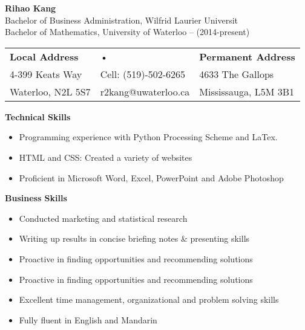 \documentclass[12pt,a4paper]{article}
\begin{document}
\begin{center}
\textbf{\Large{Rihao Kang}}\\
Bachelor of Business Administration, Wilfrid Laurier Universit\\
Bachelor of Mathematics, University of Waterloo -- (2014-present)
\vspace{12pt}
\begin{tabular}{lll}
\textbf{Local Address} & • & \textbf{Permanent Address} \\ 
4-399 Keats Way & Cell: (519)-502-6265 & 4633 The Gallops \\ 
Waterloo, N2L 5S7 & r2kang@uwaterloo.ca & Mississauga, L5M 3B1 \\ 
\end{tabular}

\end{center}


\begin{flushleft}
\textbf{Technical Skills}\\
\begin{itemize}
\item 	Programming experience with Python Processing Scheme and LaTex.
\item HTML and CSS: Created a variety of websites
\item Proficient in Microsoft Word, Excel, PowerPoint and Adobe Photoshop
\end{itemize}
\end{flushleft}



\begin{flushleft}
\textbf{Business Skills}\\
\begin{itemize}
\item Conducted marketing and statistical research
\item Writing up results in concise briefing notes \& presenting skills
\item Proactive in finding opportunities and recommending solutions
\item Proactive in finding opportunities and recommending solutions
\item Excellent time management, organizational and problem solving skills
\item Fully fluent in English and Mandarin
\end{itemize}
\end{flushleft}

\end{document}
